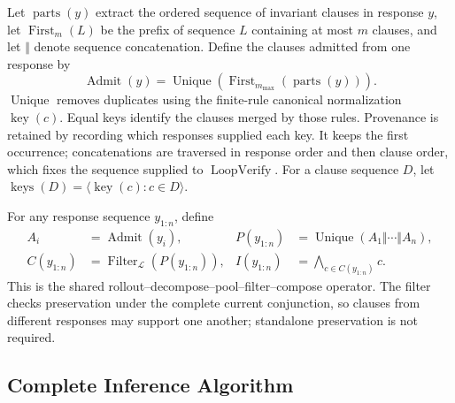 Let \(\operatorname{parts}(y)\) extract the ordered sequence of invariant
clauses in response \(y\), let \(\operatorname{First}_{m}(L)\) be the prefix
of sequence \(L\) containing at most \(m\) clauses, and let \(\Vert\) denote
sequence concatenation.  Define the clauses admitted from one response by
\begin{equation}
  \operatorname{Admit}(y)=
  \operatorname{Unique}\!\left(
    \operatorname{First}_{m_{\max}}(\operatorname{parts}(y))
  \right).
  \label{eq:formal-admit}
\end{equation}
\(\operatorname{Unique}\) removes duplicates using the finite-rule
canonical normalization \(\operatorname{key}(c)\).  Equal keys identify the
clauses merged by those rules.  Provenance is retained by
recording which responses supplied each key.  It keeps the first occurrence;
concatenations are traversed in response order and then clause order, which
fixes the sequence supplied to \(\operatorname{LoopVerify}\).
For a clause sequence \(D\), let
\(\operatorname{keys}(D)=\langle\operatorname{key}(c):c\in D\rangle\).

For any response sequence \(y_{1:n}\), define
\begin{align}
  A_i&=\operatorname{Admit}(y_i),
  &P(y_{1:n})&=\operatorname{Unique}\!\left(A_1\Vert\cdots\Vert A_n\right),
  \label{eq:formal-pool}\\
  C(y_{1:n})&=\operatorname{Filter}_{\mathcal L}(P(y_{1:n})),
  &I(y_{1:n})&=\bigwedge_{c\in C(y_{1:n})}c.
  \label{eq:formal-craft-map}
\end{align}
This is the shared rollout--decompose--pool--filter--compose operator.  The
filter checks preservation under the complete current conjunction, so clauses
from different responses may support one another; standalone preservation is
not required.

\subsection{Complete Inference Algorithm}

